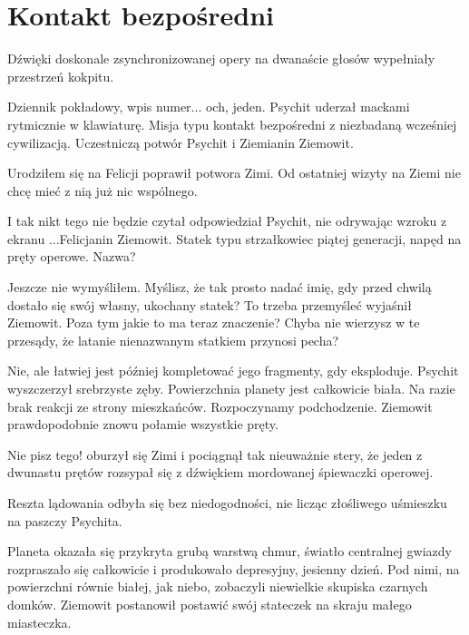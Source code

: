 \chapter{Kontakt bezpośredni}

Dźwięki doskonale zsynchronizowanej opery na dwanaście głosów wypełniały przestrzeń kokpitu.

\ds{} Dziennik pokładowy, wpis numer... och, jeden. \dm{} Psychit uderzał mackami rytmicznie w klawiaturę. \dm{}
Misja typu kontakt bezpośredni z niezbadaną wcześniej cywilizacją. Uczestniczą potwór Psychit i Ziemianin Ziemowit. \de{}

\ds{} Urodziłem się na Felicji \dm{} poprawił potwora Zimi. \dm{} Od ostatniej wizyty na Ziemi nie chcę mieć z nią już nic wspólnego. \de{}

\ds{} I tak nikt tego nie będzie czytał \dm{} odpowiedział Psychit, nie odrywając wzroku z ekranu \dm{} ...Felicjanin Ziemowit.
Statek typu strzałkowiec piątej generacji, napęd na pręty operowe. Nazwa? \de{}

\ds{} Jeszcze nie wymyśliłem. Myślisz, że tak prosto nadać imię, gdy przed chwilą dostało się swój własny, ukochany statek? To trzeba przemyśleć \dm{}
wyjaśnił Ziemowit. \dm{} Poza tym jakie to ma teraz znaczenie? Chyba nie wierzysz w te przesądy, że latanie nienazwanym statkiem przynosi pecha? \de{}

\ds{} Nie, ale łatwiej jest później kompletować jego fragmenty, gdy eksploduje. \dm{} Psychit wyszczerzył srebrzyste zęby. \dm{}
Powierzchnia planety jest całkowicie biała. Na razie brak reakcji ze strony mieszkańców. Rozpoczynamy podchodzenie.
Ziemowit prawdopodobnie znowu połamie wszystkie pręty. \de{}

\ds{} Nie pisz tego! \dm{} oburzył się Zimi i pociągnął tak nieuważnie stery, że jeden z dwunastu prętów rozsypał się z dźwiękiem mordowanej śpiewaczki operowej. \de{}

Reszta lądowania odbyła się bez niedogodności, nie licząc złośliwego uśmieszku na paszczy Psychita.

\divider{}
Planeta okazała się przykryta grubą warstwą chmur, światło centralnej gwiazdy rozpraszało się całkowicie i produkowało depresyjny, jesienny dzień.
Pod nimi, na powierzchni równie białej, jak niebo, zobaczyli niewielkie skupiska czarnych domków. 
Ziemowit postanowił postawić swój stateczek na skraju małego miasteczka.

